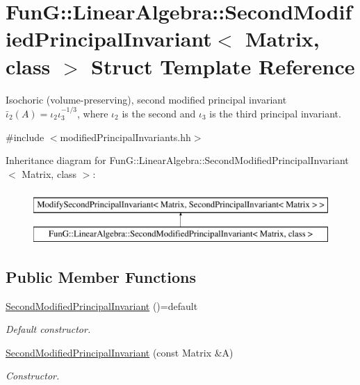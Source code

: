 \hypertarget{structFunG_1_1LinearAlgebra_1_1SecondModifiedPrincipalInvariant}{\section{Fun\-G\-:\-:Linear\-Algebra\-:\-:Second\-Modified\-Principal\-Invariant$<$ Matrix, class $>$ Struct Template Reference}
\label{structFunG_1_1LinearAlgebra_1_1SecondModifiedPrincipalInvariant}
}


Isochoric (volume-\/preserving), second modified principal invariant $ \bar\iota_2(A)=\iota_2\iota_3^{-1/3} $, where $\iota_2$ is the second and $\iota_3$ is the third principal invariant.  




{\ttfamily \#include $<$modified\-Principal\-Invariants.\-hh$>$}

Inheritance diagram for Fun\-G\-:\-:Linear\-Algebra\-:\-:Second\-Modified\-Principal\-Invariant$<$ Matrix, class $>$\-:\begin{figure}[H]
\begin{center}
\leavevmode
\includegraphics[height=2.000000cm]{structFunG_1_1LinearAlgebra_1_1SecondModifiedPrincipalInvariant}
\end{center}
\end{figure}
\subsection*{Public Member Functions}
\begin{DoxyCompactItemize}
\item 
\hypertarget{structFunG_1_1LinearAlgebra_1_1SecondModifiedPrincipalInvariant_a95ec294b3f02c3c68db75b96cf4ac2ef}{\hyperlink{structFunG_1_1LinearAlgebra_1_1SecondModifiedPrincipalInvariant_a95ec294b3f02c3c68db75b96cf4ac2ef}{Second\-Modified\-Principal\-Invariant} ()=default}\label{structFunG_1_1LinearAlgebra_1_1SecondModifiedPrincipalInvariant_a95ec294b3f02c3c68db75b96cf4ac2ef}

\begin{DoxyCompactList}\small\item\em Default constructor. \end{DoxyCompactList}\item 
\hyperlink{structFunG_1_1LinearAlgebra_1_1SecondModifiedPrincipalInvariant_a9db5c7a268d5d18833dcaca51aebcba2}{Second\-Modified\-Principal\-Invariant} (const Matrix \&A)
\begin{DoxyCompactList}\small\item\em Constructor. \end{DoxyCompactList}\end{DoxyCompactItemize}


